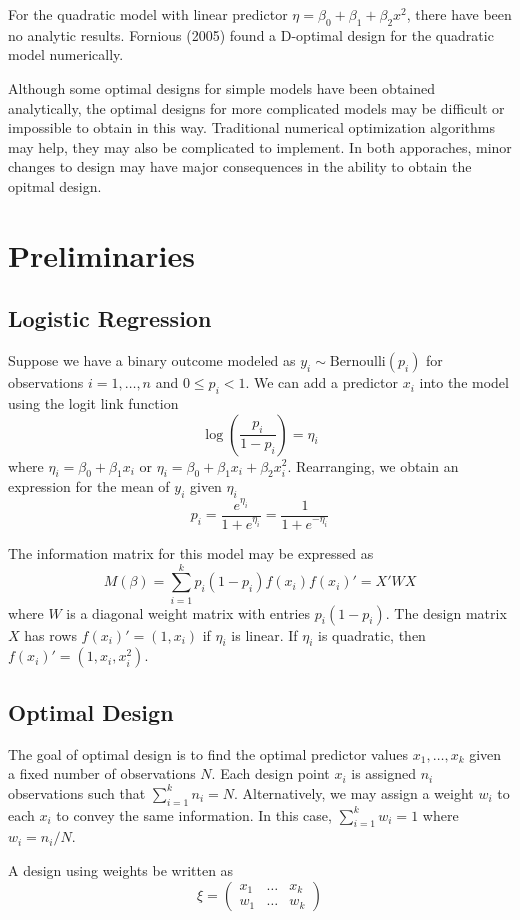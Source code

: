 \documentclass[11pt,a4paper]{article}
\begin{document}
For the quadratic model with linear predictor $\eta = \beta_0 + \beta_1 + \beta_2x^2$, there have been no analytic results. Fornious (2005) found a D-optimal design for the quadratic model numerically.

Although some optimal designs for simple models have been obtained analytically, the optimal designs for more complicated models may be difficult or impossible to obtain in this way. Traditional numerical optimization algorithms may help, they may also be complicated to implement. In both apporaches, minor changes to design may have major consequences in the ability to obtain the opitmal design.




\section{Preliminaries}
\subsection{Logistic Regression}
Suppose we have a binary outcome modeled as $y_i \sim \text{Bernoulli}(p_i)$ for observations $i = 1, \dots, n$ and $0 \leq p_i < 1$. We can add a predictor $x_i$ into the model using the logit link function
$$
\log\left( \frac{p_i}{1-p_i}\right) = \eta_i
$$
where $\eta_i = \beta_0  + \beta_1 x_{i}$ or $\eta_i = \beta_0  + \beta_1 x_{i} + \beta_2 x_i^2$. Rearranging, we obtain an expression for the mean of $y_i$ given $\eta_i$
$$
p_i = \frac{e^{\eta_i}}{1+e^{\eta_i}}= \frac{1}{1+e^{-\eta_i}} 
$$

The information matrix for this model may be expressed as
$$
M(\beta) = \sum_{i=1}^k p_i (1-p_i) f(x_i) f(x_i)' = X'WX
$$
where $W$ is a diagonal weight matrix with entries $p_i (1-p_i)$. The design matrix $X$ has rows $f(x_i)' = (1, x_i)$ if $\eta_i$ is linear. If $\eta_i$ is quadratic, then $f(x_i)' = (1,x_i,x_i^2)$.
\subsection{Optimal Design}
The goal of optimal design is to find the optimal predictor values $x_1,\dots, x_k $ given a fixed number of observations $N$. Each design point $x_i$ is assigned $n_i$ observations such that $\sum_{i=1}^k n_i = N$. Alternatively, we may assign a weight $w_i$ to each $x_i$ to convey the same information. In this case, $\sum_{i=1}^k w_i = 1$ where $w_i = n_i/N$.

\par A design using weights be written as
$$
\xi =
\begin{pmatrix}
x_1 & \dots & x_k\\
w_1 & \dots & w_k
\end{pmatrix}
$$
\end{document}
